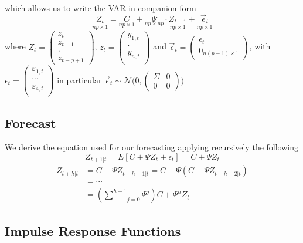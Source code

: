 \documentclass[11pt]{article}
\begin{document}
which allows us to write the VAR in companion form $$\underset{np\times 1}{Z_{t}} = \underset{np\times 1}{C} + \underset{np\times np}{\Psi}\cdot \underset{np\times 1}{Z_{t-1}} + \underset{np\times 1}{\vec{\epsilon}_{t}}$$
where $Z_{t} = \begin{pmatrix}z_{t}\\ z_{t-1}\\ \cdot \\ z_{t-p+1}\end{pmatrix}$, 
$z_{t} = \begin{pmatrix}
  y_{1,t}\\
  \cdot\\
  y_{n,t}\\
\end{pmatrix}$
  and $\vec{\epsilon}_{t} = \begin{pmatrix} \epsilon_{t}\\ 0_{n(p-1) \times 1} \end{pmatrix}$, with 
$\epsilon_{t} = \begin{pmatrix}
  \varepsilon_{1,t}\\
  \cdots \\
  \varepsilon_{4,t}\\
\end{pmatrix}$ in particular $\vec{\epsilon}_{t}\sim \mathcal{N} \Big(0,\begin{pmatrix} \Sigma & 0\\ 0 & 0 \end{pmatrix} \Big)$



\subsection{Forecast}

We derive the equation used for our forecasting applying recursively the following $$ Z_{t+1|t} = E[C+\Psi Z_{t} + \epsilon_{t}] = C+\Psi Z_{t}$$ 
\begin{align*}
 Z_{t+h|t} &= C+ \Psi Z_{t+h-1|t} =C + \Psi (C+\Psi Z_{t+h-2|t}) \\ 
&=\cdots \\
&= (\underset{j=0}{\overset{h-1}{\sum}}{\Psi}^{j})C + {\Psi}^{h} Z_{t}
\end{align*}

\subsection{Impulse Response Functions}
\end{document}
